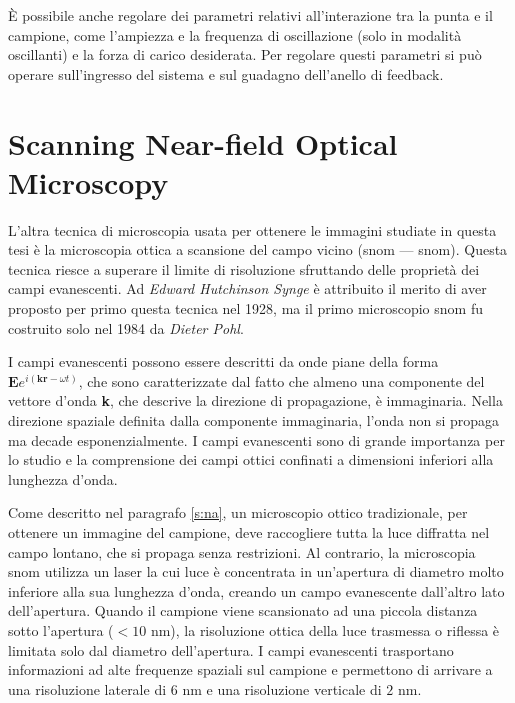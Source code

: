 \documentclass[../main.tex]{subfiles}
\begin{document}
È possibile anche regolare dei parametri relativi all'interazione tra la punta e il campione, come l'ampiezza e la frequenza di oscillazione (solo in modalità oscillanti) e la forza di carico desiderata. Per regolare questi parametri si può operare sull'ingresso del sistema e sul guadagno dell'anello di feedback.

\section{Scanning Near-field Optical Microscopy}

L'altra tecnica di microscopia usata per ottenere le immagini studiate in questa tesi è la microscopia ottica a scansione del campo vicino (\acrlong{snom} --- \acrshort{snom}). Questa tecnica riesce a superare il limite di risoluzione sfruttando delle proprietà dei campi evanescenti. Ad \textit{Edward Hutchinson Synge} è attribuito il merito di aver proposto per primo questa tecnica nel 1928,\cite{synge_1928} ma il primo microscopio \acrshort{snom} fu costruito solo nel 1984 da \textit{Dieter Pohl}.\cite{pohl_1984}

I campi evanescenti possono essere descritti da onde piane della forma $\mathbf{E}e^{i(\mathbf{kr}-\omega t)}$, che sono caratterizzate dal fatto che almeno una componente del vettore d'onda \textbf{k}, che descrive la direzione di propagazione, è immaginaria. Nella direzione spaziale definita dalla componente immaginaria, l'onda non si propaga ma decade esponenzialmente. I campi evanescenti sono di grande importanza per lo studio e la comprensione dei campi ottici confinati a dimensioni inferiori alla lunghezza d'onda.\cite{novotny_2012}

Come descritto nel paragrafo \ref{s:na}, un microscopio ottico tradizionale, per ottenere un immagine del campione, deve raccogliere tutta la luce diffratta nel campo lontano, che si propaga senza restrizioni.
Al contrario, la microscopia \acrshort{snom} utilizza un laser la cui luce è concentrata in un'apertura di diametro molto inferiore alla sua lunghezza d'onda, creando un campo evanescente dall'altro lato dell'apertura.\cite{betzig_1992} Quando il campione viene scansionato ad una piccola distanza sotto l'apertura ($<10$ nm), la risoluzione ottica della luce trasmessa o riflessa è limitata solo dal diametro dell'apertura. I campi evanescenti trasportano informazioni ad alte frequenze spaziali sul campione e permettono di arrivare a una risoluzione laterale di $6$ nm\cite{ma_2021} e una risoluzione verticale di $2$ nm.\cite{oshikane_2007}\\
\end{document}
